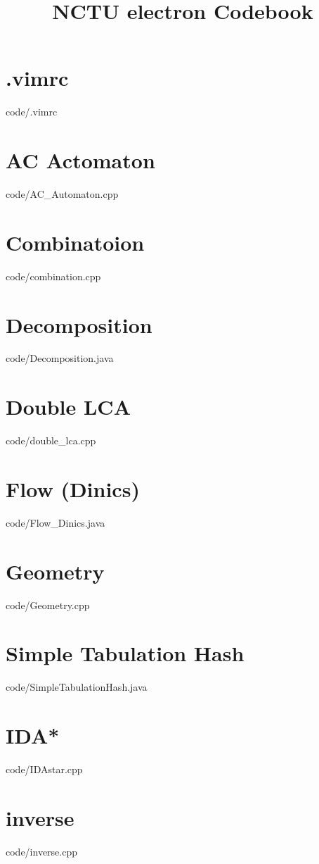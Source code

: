 \documentclass [landscape,10pt,a4paper,twocolumn]{article}
\title {NCTU electron Codebook}
\begin{document}
\thispagestyle{fancy}
\tableofcontents
\newpage
\section{.vimrc}
 {code/.vimrc}
\section{AC Actomaton}
 {code/AC_Automaton.cpp}
\section{Combinatoion}
 {code/combination.cpp}
\section{Decomposition}
 {code/Decomposition.java}
\section{Double LCA}
 {code/double_lca.cpp}
\section{Flow (Dinics)}
 {code/Flow_Dinics.java}
\section{Geometry}
 {code/Geometry.cpp}
\section{Simple Tabulation Hash}
 {code/SimpleTabulationHash.java}
\section{IDA*}
 {code/IDAstar.cpp}
\section{inverse}
 {code/inverse.cpp}
\end{document}
